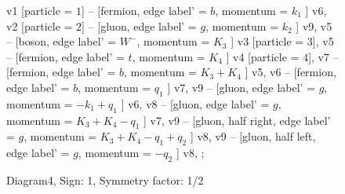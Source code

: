 \documentclass{revtex4}
\begin{document}
\begin{figure}[!htb]
\begin{center}
{    %
v1 [particle = \(1\)] -- [fermion, edge label' = \(b\), momentum = \(k_{1}\) ] v6, 
v2 [particle = \(2\)] -- [gluon, edge label' = \(g\), momentum = \(k_{2}\) ] v9, 
v5 -- [boson, edge label' = \(W^{-}\), momentum = \(K_{3}\) ] v3 [particle = \(3\)], 
v5 -- [fermion, edge label' = \(t\), momentum = \(K_{4}\) ] v4 [particle = \(4\)], 
v7 -- [fermion, edge label' = \(b\), momentum = \(K_{3} + K_{4}\) ] v5, 
v6 -- [fermion, edge label' = \(b\), momentum = \(q_{1}\) ] v7, 
v9 -- [gluon, edge label' = \(g\), momentum = \(-k_{1} + q_{1}\) ] v6, 
v8 -- [gluon, edge label' = \(g\), momentum = \(K_{3} + K_{4} - q_{1}\) ] v7, 
v9 -- [gluon, half right, edge label' = \(g\), momentum = \(K_{3} + K_{4} - q_{1} + q_{2}\) ] v8, 
v9 -- [gluon, half left, edge label' = \(g\), momentum = \(-q_{2}\) ] v8, 
};
\end{center}
\caption{Diagram4, Sign: 1, Symmetry factor: 1/2}
\end{figure}
\newpage
\end{document}
